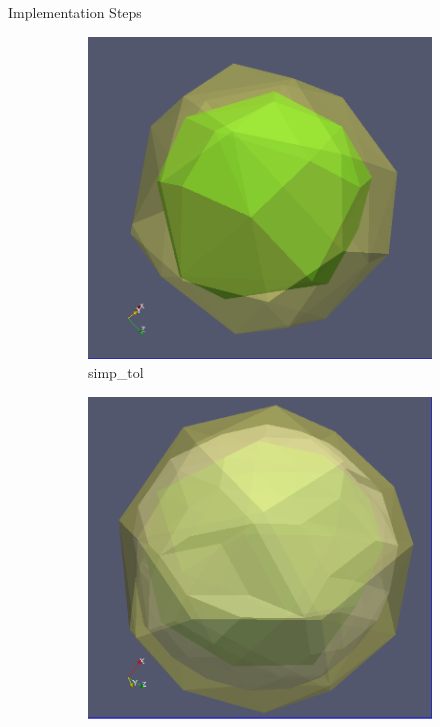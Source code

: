 \documentclass{beamer}
\begin{document}
\begin{frame} {Implementation Steps}
\begin{figure}[h]
    \begin{subfigure}[b]{0.23\textwidth}
      \includegraphics[width=\textwidth]{simp_tol}
      \caption[4]{simp\_tol}
    \end{subfigure}
    \begin{subfigure}[b]{0.23\textwidth}
      \includegraphics[width=\textwidth]{mutualtesslation}

\end{subfigure}
\end{figure}
\end{frame}
\end{document}
